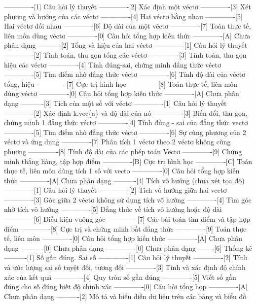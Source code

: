 -------------[1] Câu hỏi lý thuyết
-------------[2] Xác định một véctơ
-------------[3] Xét phương và hướng của các véctơ
-------------[4] Hai véctơ bằng nhau
-------------[5] Hai véctơ đối nhau
-------------[6] Độ dài của một véctơ
-------------[7] Toán thực tế, liên môn dùng véctơ
-------------[0] Câu hỏi tổng hợp kiến thức
-------------[A] Chưa phân dạng
----------[2] Tổng và hiệu của hai véctơ
-------------[1] Câu hỏi lý thuyết
-------------[2] Tính toán, thu gọn tổng các véctơ
-------------[3] Tính toán, thu gọn hiệu các véctơ
-------------[4] Tính đúng-sai, chứng minh đẳng thức véctơ
-------------[5] Tìm điểm nhờ đẳng thức véctơ
-------------[6] Tính độ dài của véctơ tổng, hiệu
-------------[7] Cực trị hình học
-------------[8] Toán thực tế, liên môn dùng véctơ
-------------[0] Câu hỏi tổng hợp kiến thức
-------------[A] Chưa phân dạng
----------[3] Tích của một số với véctơ
-------------[1] Câu hỏi lý thuyết
-------------[2] Xác định k.vec\{a\} và độ dài của nó
-------------[3] Biến đổi, thu gọn, chứng minh 1 đẳng thức véctơ
-------------[4] Tính đúng - sai của đẳng thức vectơ
-------------[5] Tìm điểm nhờ đẳng thức véctơ
-------------[6] Sự cùng phương của 2 véctơ và ứng dụng
-------------[7] Phân tích 1 véctơ theo 2 véctơ không cùng phương
-------------[8] Tính độ dài của các phép toán Vectơ
-------------[9] Chứng minh thẳng hàng, tập hợp điểm
-------------[B] Cực trị hình học
-------------[C] Toán thực tế, liên môn dùng tích 1 số với vecto
-------------[0] Câu hỏi tổng hợp kiến thức
-------------[A] Chưa phân dạng
----------[4] Tích vô hướng (chưa xét tọa độ)
-------------[1] Câu hỏi lý thuyết
-------------[2] Tích vô hướng giữa hai vectơ
-------------[3] Góc giữa 2 véctơ không sử dụng tích vô hướng
-------------[4] Tìm góc nhờ tích vô hướng
-------------[5] Đẳng thức về tích vô hướng hoặc độ dài
-------------[6] Điều kiện vuông góc
-------------[7] Các bài toán tìm điểm và tập hợp điểm
-------------[8] Cực trị và chứng minh bất đẳng thức
-------------[9] Toán thực tế, liên môn
-------------[0] Câu hỏi tổng hợp kiến thức
-------------[A] Chưa phân dạng
----------[0] Chưa phân dạng
-------------[0] Chưa phân dạng
-------[6] Thống kê
----------[1] Số gần đúng. Sai số
-------------[1] Câu hỏi lý thuyết
-------------[2] Tính và ước lượng sai số tuyệt đối, tương đối
-------------[3] Tính và xác định độ chính xác của kết quả
-------------[4] Quy tròn số gần đúng
-------------[5] Viết số gần đúng cho số đúng biết độ chính xác
-------------[0] Câu hỏi tổng hợp
-------------[A] Chưa phân dạng
----------[2] Mô tả và biểu diễn dữ liệu trên các bảng và biểu đồ
